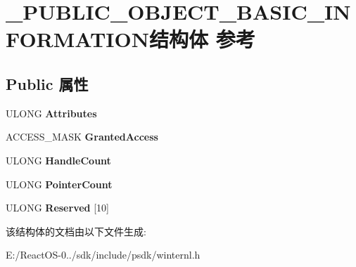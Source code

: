 \hypertarget{struct___p_u_b_l_i_c___o_b_j_e_c_t___b_a_s_i_c___i_n_f_o_r_m_a_t_i_o_n}{}\section{\+\_\+\+P\+U\+B\+L\+I\+C\+\_\+\+O\+B\+J\+E\+C\+T\+\_\+\+B\+A\+S\+I\+C\+\_\+\+I\+N\+F\+O\+R\+M\+A\+T\+I\+O\+N结构体 参考}
\label{struct___p_u_b_l_i_c___o_b_j_e_c_t___b_a_s_i_c___i_n_f_o_r_m_a_t_i_o_n}
\subsection*{Public 属性}
\begin{DoxyCompactItemize}
\item 
\mbox{\label{struct___p_u_b_l_i_c___o_b_j_e_c_t___b_a_s_i_c___i_n_f_o_r_m_a_t_i_o_n_aff71d25fe1d74b35ad9ac042aa3efe5b}} 
U\+L\+O\+NG {\bfseries Attributes}
\item 
\mbox{\label{struct___p_u_b_l_i_c___o_b_j_e_c_t___b_a_s_i_c___i_n_f_o_r_m_a_t_i_o_n_aeee99b3e4a670eb29c6af86a7f1f1c7b}} 
A\+C\+C\+E\+S\+S\+\_\+\+M\+A\+SK {\bfseries Granted\+Access}
\item 
\mbox{\label{struct___p_u_b_l_i_c___o_b_j_e_c_t___b_a_s_i_c___i_n_f_o_r_m_a_t_i_o_n_a59a0a4e922bf1c61e742d561c9d58404}} 
U\+L\+O\+NG {\bfseries Handle\+Count}
\item 
\mbox{\label{struct___p_u_b_l_i_c___o_b_j_e_c_t___b_a_s_i_c___i_n_f_o_r_m_a_t_i_o_n_a514577e7e3927aab197b0be4d9e7164e}} 
U\+L\+O\+NG {\bfseries Pointer\+Count}
\item 
\mbox{\label{struct___p_u_b_l_i_c___o_b_j_e_c_t___b_a_s_i_c___i_n_f_o_r_m_a_t_i_o_n_a4526cde67f99026f4f8bdf54b351ed52}} 
U\+L\+O\+NG {\bfseries Reserved} \mbox{[}10\mbox{]}
\end{DoxyCompactItemize}


该结构体的文档由以下文件生成\+:\begin{DoxyCompactItemize}
\item 
E\+:/\+React\+O\+S-\/0../sdk/include/psdk/winternl.\+h\end{DoxyCompactItemize}
